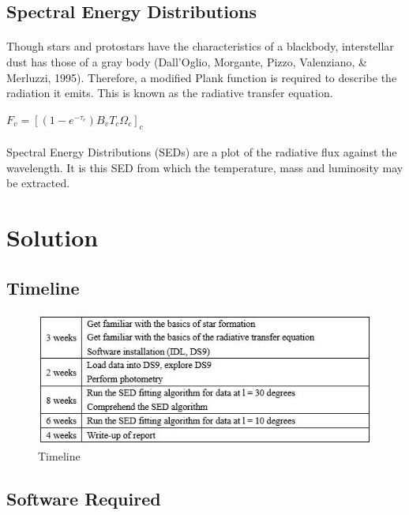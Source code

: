 \documentclass{article}
\begin{document}
\subsection{Spectral Energy Distributions}
\paragraph{}

Though stars and protostars have the characteristics of a blackbody, interstellar dust has those of a gray body (Dall’Oglio, Morgante, Pizzo, Valenziano, \& Merluzzi, 1995). Therefore, a modified Plank function is required to describe the radiation it emits. This is known as the radiative transfer equation.

\begin{center}
$F_v={[(1-e^{-\tau_c } ) B_v T_c \Omega_c ]_c}$
\end{center}

\paragraph{}
Spectral Energy Distributions (SEDs) are a plot of the radiative flux against the wavelength. It is this SED from which the temperature, mass and luminosity may be extracted. 

\section{Solution}
\subsection{Timeline}

\begin{figure}[h!]
\includegraphics[width=\linewidth]{timeline.jpg}
\caption{Timeline}
\label{fig:timeline1}
\end{figure}

\subsection{Software Required}
\end{document}

